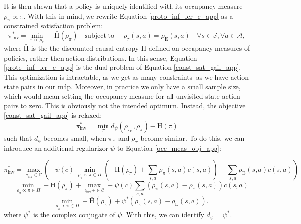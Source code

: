 It is then shown that a policy is uniquely identified with its occupancy measure $\rho_{\pi} \propto \pi$. With this in mind, we rewrite Equation \ref{proto_inf_ler_c_app} as a constrained satisfaction problem:
\begin{equation}
    \label{const_sat_gail_app}
    \pi_{\text{inv}}^* = \min_{\pi \propto \rho_{\pi}} - \bar{\text{H}}(\rho_{\pi})\quad \text{subject to }\quad \rho_{\pi}(s,a) = \rho_{\text{E}}(s,a) \quad \forall s \in \mathcal{S}, \forall a \in \mathcal{A},
\end{equation}
where $\bar{\text{H}}$ is the the discounted causal entropy $\text{H}$ defined on occupancy measures of policies, rather then action distributions. In this sense, Equation \ref{proto_inf_ler_c_app} is the dual problem of Equation \ref{const_sat_gail_app}. 
This optimization is intractable, as we get as many constraints, as we have action state pairs in our \ac{mdp}. Moreover, in practice we only have a small sample size, which would mean setting 
the occupancy measure for all unvisited state action pairs to zero. This is obviously not the intended optimum. Instead, the objective \ref{const_sat_gail_app} is relaxed:
\begin{equation}
    \label{dist_opt_app}
    \pi_{\text{inv}}^* = \min_{\pi} d_{\psi}(\rho_{\pi_{\text{E}}}, \rho_{\pi}) - \text{H}(\pi)
\end{equation}
such that $d_{\psi}$ becomes small, when $\pi_{\text{E}}$ and $\rho_{\pi}$ become similar. To do this, we can introduce an additional regularizor $\psi$ to Equation \ref{occ_meas_obj_app}:

\begin{equation*}
    \pi_{\text{inv}}^* = \max_{c_{\text{inv}} \in \mathcal{C}} \left(-\psi(c) \ \min_{\rho_\pi \propto \pi \in \Pi} \left(- \bar{\text{H}}(\rho_\pi) + \sum_{s,a} \rho_\pi(s,a) c(s,a) \right) - \sum_{s,a} \rho_{\text{E}}(s,a) c(s,a) \right)
\end{equation*}
\begin{equation*}
    = \min_{\rho_\pi \propto \pi \in \Pi}- \bar{\text{H}}(\rho_\pi) + \max_{c_{\text{inv}} + \in \mathcal{C}} -\psi(c) \sum_{s,a} \left( \rho_\pi(s,a) - \rho_{\text{E}}(s,a)\right) c(s,a)
\end{equation*}
\begin{equation}
    \label{proto_inf_ler_c_reg_app}
    = \min_{\rho_\pi \propto \pi \in \Pi}- \bar{\text{H}}(\rho_\pi) + \psi^*(\rho_\pi(s,a) - \rho_{\text{E}}(s,a)),
\end{equation}
where $\psi^*$ is the complex conjugate of $\psi$. With this, we can identify $d_{\psi} = \psi^*$.\\

